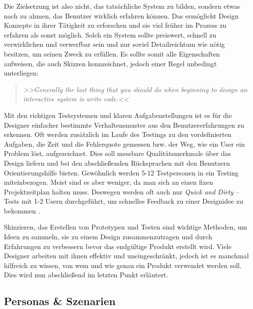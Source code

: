 Die Zielsetzung ist also nicht, das tatsächliche System zu bilden, sondern etwas nach zu ahmen, das Benutzer wirklich erfahren können. Das ermöglicht Design Konzepte in ihrer Tätigkeit zu erforschen und sie viel früher im Prozess zu erfahren als sonst möglich. Solch ein System sollte preiswert, schnell zu verwirklichen und verwerfbar sein und nur soviel Detailreichtum wie nötig besitzen, um seinen Zweck zu erfüllen. Es sollte somit alle Eigenschaften aufweisen, die auch Skizzen kennzeichnet, jedoch einer Regel unbedingt unterliegen: 

\begin{quote}
	\textsl{>>Generally the last thing that you should do when beginning to design an interactive system is write code.<<}
\begin{flushright}\citep{Buxton:2007}\end{flushright}
\end{quote}	

Mit den richtigen Testsystemen und klaren Aufgabenstellungen ist es für die Designer einfacher bestimmte Verhaltensmuster aus den Benutzererfahrungen zu erkennen. Oft werden zusätzlich im Laufe des Testings zu den vordefinierten Aufgaben, die Zeit und die Fehlerquote gemessen bzw. der Weg, wie ein User ein Problem löst, aufgezeichnet. Dies soll messbare Qualitätsmerkmale über das Design liefern und bei den abschließenden Rücksprachen mit den Benutzern Orientierungshilfe bieten.
Gewöhnlich werden 5-12 Testpersonen in ein Testing miteinbezogen. \citep{Dumas:1999} Meist sind es aber weniger, da man sich an einen fixen Projektzeitplan halten muss. Deswegen werden oft auch nur \emph{Quick and Dirty} – Tests mit 1-2 Usern durchgeführt, um schnelles Feedback zu einer Designidee zu bekommen \citep{Sharp:2002}.

\medskip Skizzieren, das Erstellen von Prototypen und Testen sind wichtige Methoden, um Ideen zu sammeln, sie zu einem Design zusammenzutragen und durch Erfahrungen zu verbessern bevor das endgültige Produkt erstellt wird. Viele Designer arbeiten mit ihnen effektiv und uneingeschränkt, jedoch ist es manchmal hilfreich zu wissen, von wem und wie genau ein Produkt verwendet werden soll. Dies wird nun abschließend im letzten Punkt erläutert.

\subsection{Personas \& Szenarien}

